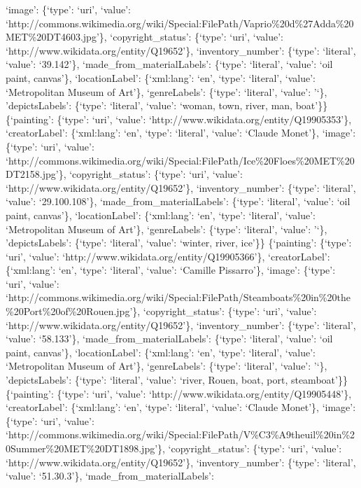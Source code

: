 \documentclass[
  letterpaper,
  DIV=11,
  numbers=noendperiod]{scrreprt}
\begin{document}
`image': \{`type': `uri', `value':
`http://commons.wikimedia.org/wiki/Special:FilePath/Vaprio\%20d\%27Adda\%20MET\%20DT4603.jpg'\},
`copyright\_status': \{`type': `uri', `value':
`http://www.wikidata.org/entity/Q19652'\}, `inventory\_number':
\{`type': `literal', `value': `39.142'\}, `made\_from\_materialLabels':
\{`type': `literal', `value': `oil paint, canvas'\}, `locationLabel':
\{`xml:lang': `en', `type': `literal', `value': `Metropolitan Museum of
Art'\}, `genreLabels': \{`type': `literal', `value': '`\},
'depictsLabels': \{`type': `literal', `value': `woman, town, river, man,
boat'\}\} \{`painting': \{`type': `uri', `value':
`http://www.wikidata.org/entity/Q19905353'\}, `creatorLabel':
\{`xml:lang': `en', `type': `literal', `value': `Claude Monet'\},
`image': \{`type': `uri', `value':
`http://commons.wikimedia.org/wiki/Special:FilePath/Ice\%20Floes\%20MET\%20DT2158.jpg'\},
`copyright\_status': \{`type': `uri', `value':
`http://www.wikidata.org/entity/Q19652'\}, `inventory\_number':
\{`type': `literal', `value': `29.100.108'\},
`made\_from\_materialLabels': \{`type': `literal', `value': `oil paint,
canvas'\}, `locationLabel': \{`xml:lang': `en', `type': `literal',
`value': `Metropolitan Museum of Art'\}, `genreLabels': \{`type':
`literal', `value': '`\}, 'depictsLabels': \{`type': `literal', `value':
`winter, river, ice'\}\} \{`painting': \{`type': `uri', `value':
`http://www.wikidata.org/entity/Q19905366'\}, `creatorLabel':
\{`xml:lang': `en', `type': `literal', `value': `Camille Pissarro'\},
`image': \{`type': `uri', `value':
`http://commons.wikimedia.org/wiki/Special:FilePath/Steamboats\%20in\%20the\%20Port\%20of\%20Rouen.jpg'\},
`copyright\_status': \{`type': `uri', `value':
`http://www.wikidata.org/entity/Q19652'\}, `inventory\_number':
\{`type': `literal', `value': `58.133'\}, `made\_from\_materialLabels':
\{`type': `literal', `value': `oil paint, canvas'\}, `locationLabel':
\{`xml:lang': `en', `type': `literal', `value': `Metropolitan Museum of
Art'\}, `genreLabels': \{`type': `literal', `value': '`\},
'depictsLabels': \{`type': `literal', `value': `river, Rouen, boat,
port, steamboat'\}\} \{`painting': \{`type': `uri', `value':
`http://www.wikidata.org/entity/Q19905448'\}, `creatorLabel':
\{`xml:lang': `en', `type': `literal', `value': `Claude Monet'\},
`image': \{`type': `uri', `value':
`http://commons.wikimedia.org/wiki/Special:FilePath/V\%C3\%A9theuil\%20in\%20Summer\%20MET\%20DT1898.jpg'\},
`copyright\_status': \{`type': `uri', `value':
`http://www.wikidata.org/entity/Q19652'\}, `inventory\_number':
\{`type': `literal', `value': `51.30.3'\}, `made\_from\_materialLabels':
\end{document}
